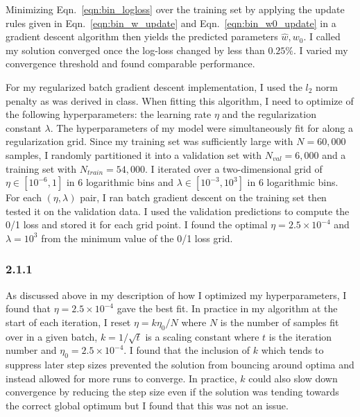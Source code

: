 \documentclass[12pt]{amsart}
\begin{document}
Minimizing Eqn.~\ref{eqn:bin_logloss} over the training set by applying the update rules given in Eqn.~\ref{eqn:bin_w_update} and Eqn.~\ref{eqn:bin_w0_update} in a gradient descent algorithm then yields the predicted parameters $\hat{w}, w_0$.  I called my solution converged once the log-loss changed by less than $0.25 \%$.  I varied my convergence threshold and found comparable performance.

For my regularized batch gradient descent implementation, I used the $l_2$ norm penalty as was derived in class.  When fitting this algorithm, I need to optimize of the following hyperparameters: the learning rate $\eta$ and the regularization constant $\lambda$.  The hyperparameters of my model were simultaneously fit for along a regularization grid.  Since my training set was sufficiently large with $N = 60,000$ samples, I randomly partitioned it into a validation set with $N_{val} = 6,000$ and a training set with $N_{train} = 54,000$.  I iterated over a two-dimensional grid of $\eta \in [10^{-6},1]$ in 6 logarithmic bins and $\lambda \in [10^{-3},10^{3}]$ in 6 logarithmic bins.  For each $(\eta,\lambda)$ pair, I ran batch gradient descent on the training set then tested it on the validation data.  I used the validation predictions to compute the 0/1 loss and stored it for each grid point.  I found the optimal $\eta = 2.5 \times 10^{-4}$ and $\lambda = 10^3$ from the minimum value of the 0/1 loss grid.  

\subsubsection*{2.1.1}
As discussed above in my description of how I optimized my hyperparameters, I found that $\eta = 2.5 \times 10^{-4}$ gave the best fit.  In practice in my algorithm at the start of each iteration, I reset $\eta = k\eta_0/N$ where $N$ is the number of samples fit over in a given batch, $k = 1/\sqrt{t}$ is a scaling constant where $t$ is the iteration number and $\eta_0 = 2.5 \times 10^{-4}$.  I found that the inclusion of $k$ which tends to suppress later step sizes prevented the solution from bouncing around optima and instead allowed for more runs to converge.  In practice, $k$ could also slow down convergence by reducing the step size even if the solution was tending towards the correct global optimum but I found that this was not an issue.
\end{document}
